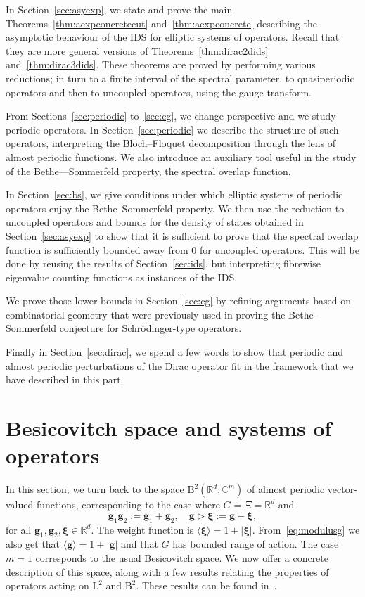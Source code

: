\documentclass[AHL,Unicode,longabstracts,published]{cedram}
\newcommand{\RB}{\mathrm{B}}
\newcommand{\RL}{\mathrm{L}}
\newcommand{\R}{\mathbb R}
\newcommand{\C}{\mathbb C}
\newcommand{\bxi}{\boldsymbol \xi}
\newcommand{\bg}{\mathbf g}
\newcommand{\act}{\triangleright}
\newcommand{\abs}[1]{\left\lvert #1 \right\rvert}
\newcommand{\ang}[1]{\langle #1 \rangle}
\begin{document}
In Section~\ref{sec:asyexp}, we state and prove the main Theorems~\ref{thm:aexpconcretecut} and~\ref{thm:aexpconcrete} describing the asymptotic behaviour of the IDS for elliptic
systems of operators. Recall that they are more general versions of Theorems~\ref{thm:dirac2dids} and~\ref{thm:dirac3dids}. These theorems are proved by performing various reductions; in turn to a finite interval of the spectral parameter, to quasiperiodic operators and then to uncoupled operators, using the gauge transform.
 
From Sections~\ref{sec:periodic} to~\ref{sec:cg}, we change perspective and we study periodic operators. In Section~\ref{sec:periodic} we describe the structure of such operators, interpreting the Bloch--Floquet decomposition through the lens of almost periodic functions. We also introduce an auxiliary tool useful in the study of the Bethe—Sommerfeld property, the spectral overlap function.
 
In Section~\ref{sec:bs}, we give conditions under which elliptic systems of periodic operators enjoy the Bethe–Sommerfeld property. We then use the reduction to uncoupled operators and bounds for the density of states obtained in Section~\ref{sec:asyexp} to show that it is sufficient to prove that the spectral overlap function is sufficiently bounded away from 0 for uncoupled operators. This will be done by reusing the results of Section~\ref{sec:ids}, but interpreting fibrewise eigenvalue counting functions as instances of the IDS.
 
We prove those lower bounds in Section~\ref{sec:cg} by refining arguments based on combinatorial geometry that were previously used in proving the Bethe–Sommerfeld conjecture for Schr\"odinger-type operators.


Finally in Section~\ref{sec:dirac}, we spend a few words to show that periodic and almost periodic perturbations of the Dirac operator fit in the framework that we have described in this part.


\section{Besicovitch space and systems of operators} \label{sec:besicovitch}

In this section, we turn back to the space $\RB^2(\R^d;\C^m)$ of almost periodic vector-valued functions, corresponding to the case where $G = \Xi = \R^d$ and
\begin{equation}
\bg_1\bg_2:=\bg_1+\bg_2, \quad \bg\act\bxi:=\bg+\bxi,
\end{equation}
for all $\bg_1,\bg_2,\bxi\in\R^d$. The weight function is $\ang \bxi = 1 + \abs \bxi$. From~\eqref{eq:modulusg} we also get that $\ang \bg = 1 + \abs
\bg$ and that $G$ has bounded range of action. The case $m = 1$ corresponds to the usual Besicovitch space. We now offer a concrete description of this space, along with a few results relating the properties of operators acting on $\RL^2$ and $\RB^2$. These results can be found in~\cite{CoburnMoyerSinger,Shubin1978,Shubin1979}.
\end{document}
